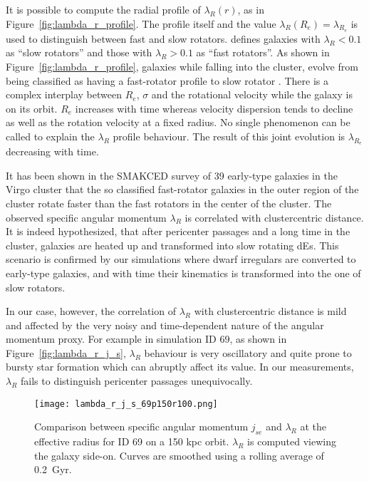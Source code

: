 It is possible to compute the radial profile of $\lambda_R(r)$, as in Figure~\ref{fig:lambda_r_profile}.
The profile itself and the value $\lambda_R(R_e) = \lambda_{R_e}$ is used to distinguish between fast and slow rotators.
\citet{Emsellem2007} defines galaxies with $\lambda_R < 0.1$ as ``slow rotators'' and those with $\lambda_R>0.1$ as ``fast rotators''.
As shown in Figure~\ref{fig:lambda_r_profile}, galaxies while falling into the cluster, evolve from being classified as having a fast-rotator profile to slow rotator \citep[cf.][]{Emsellem2011}.
There is a complex interplay between $R_e$, $\sigma$ and the rotational velocity while the galaxy is on its orbit.
$R_e$ increases with time whereas velocity dispersion tends to decline as well as the rotation velocity at a fixed radius.
No single phenomenon can be called to explain the $\lambda_R$ profile behaviour.
The result of this joint evolution is $\lambda_{R_e}$ decreasing with time.


It has been shown in the \textsc{SMAKCED} survey of 39 early-type galaxies in the Virgo cluster \citep{Toloba2014, Toloba2015} that the so classified fast-rotator galaxies in the outer region of the cluster rotate faster than the fast rotators in the center of the cluster.
The observed specific angular momentum $\lambda_R$ is correlated with clustercentric distance. %
It is indeed hypothesized, that after pericenter passages and a long time in the cluster, galaxies are heated up and transformed into slow rotating dEs.
This scenario is confirmed by our simulations where dwarf irregulars are converted to early-type galaxies, and with time their kinematics is transformed into the one of slow rotators.

In our case, however, the correlation of $\lambda_R$ with clustercentric distance is mild and affected by the very noisy and time-dependent nature of the angular momentum proxy.
For example in simulation ID 69, as shown in Figure~\ref{fig:lambda_r_j_s}, $\lambda_R$ behaviour is very oscillatory and quite prone to bursty star formation which can abruptly affect its value.
In our measurements, $\lambda_R$ fails to distinguish pericenter passages unequivocally.

\begin{figure}
\centering
\texttt{[image: lambda\_r\_j\_s\_69p150r100.png]}
\caption{Comparison between specific angular momentum $j_{se}$ and $\lambda_R$ at the effective radius for ID 69 on a 150 kpc orbit.
$\lambda_R$ is computed viewing the galaxy side-on.
Curves are smoothed using a rolling average of 0.2~Gyr.}
\label{fig:lambda_r_j_s_sigma}
\end{figure}


